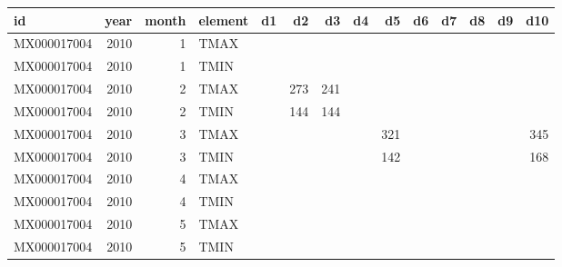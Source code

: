 \begin{tabular}{lrrlrrrrrrrrrr}
  \toprule
 id & year & month & element & d1 & d2 & d3 & d4 & d5 & d6 & d7 & d8 & d9 & d10 \\ 
  \midrule
  MX000017004 & 2010 &   1 & TMAX &  &  &  &  &  &  &  &  &  &  \\ 
  MX000017004 & 2010 &   1 & TMIN &  &  &  &  &  &  &  &  &  &  \\ 
  MX000017004 & 2010 &   2 & TMAX &  & 273 & 241 &  &  &  &  &  &  &  \\ 
  MX000017004 & 2010 &   2 & TMIN &  & 144 & 144 &  &  &  &  &  &  &  \\ 
  MX000017004 & 2010 &   3 & TMAX &  &  &  &  & 321 &  &  &  &  & 345 \\ 
  MX000017004 & 2010 &   3 & TMIN &  &  &  &  & 142 &  &  &  &  & 168 \\ 
  MX000017004 & 2010 &   4 & TMAX &  &  &  &  &  &  &  &  &  &  \\ 
  MX000017004 & 2010 &   4 & TMIN &  &  &  &  &  &  &  &  &  &  \\ 
  MX000017004 & 2010 &   5 & TMAX &  &  &  &  &  &  &  &  &  &  \\ 
  MX000017004 & 2010 &   5 & TMIN &  &  &  &  &  &  &  &  &  &  \\ 
   \bottomrule
\end{tabular}

